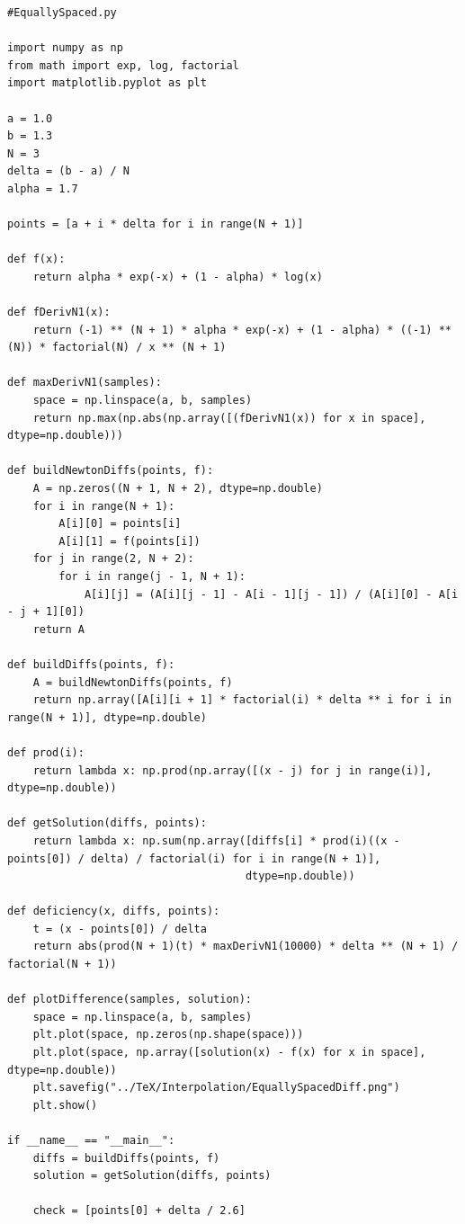 \documentclass[14pt, a4paper]{article}
\begin{document}
\begin{lstlisting}
#EquallySpaced.py

import numpy as np
from math import exp, log, factorial
import matplotlib.pyplot as plt

a = 1.0
b = 1.3
N = 3
delta = (b - a) / N
alpha = 1.7

points = [a + i * delta for i in range(N + 1)]

def f(x):
    return alpha * exp(-x) + (1 - alpha) * log(x)

def fDerivN1(x):
    return (-1) ** (N + 1) * alpha * exp(-x) + (1 - alpha) * ((-1) ** (N)) * factorial(N) / x ** (N + 1)

def maxDerivN1(samples):
    space = np.linspace(a, b, samples)
    return np.max(np.abs(np.array([(fDerivN1(x)) for x in space], dtype=np.double)))

def buildNewtonDiffs(points, f):
    A = np.zeros((N + 1, N + 2), dtype=np.double)
    for i in range(N + 1):
        A[i][0] = points[i]
        A[i][1] = f(points[i])
    for j in range(2, N + 2):
        for i in range(j - 1, N + 1):
            A[i][j] = (A[i][j - 1] - A[i - 1][j - 1]) / (A[i][0] - A[i - j + 1][0])
    return A

def buildDiffs(points, f):
    A = buildNewtonDiffs(points, f)
    return np.array([A[i][i + 1] * factorial(i) * delta ** i for i in range(N + 1)], dtype=np.double)

def prod(i):
    return lambda x: np.prod(np.array([(x - j) for j in range(i)], dtype=np.double))

def getSolution(diffs, points):
    return lambda x: np.sum(np.array([diffs[i] * prod(i)((x - points[0]) / delta) / factorial(i) for i in range(N + 1)],
                                     dtype=np.double))

def deficiency(x, diffs, points):
    t = (x - points[0]) / delta
    return abs(prod(N + 1)(t) * maxDerivN1(10000) * delta ** (N + 1) / factorial(N + 1))

def plotDifference(samples, solution):
    space = np.linspace(a, b, samples)
    plt.plot(space, np.zeros(np.shape(space)))
    plt.plot(space, np.array([solution(x) - f(x) for x in space], dtype=np.double))
    plt.savefig("../TeX/Interpolation/EquallySpacedDiff.png")
    plt.show()

if __name__ == "__main__":
    diffs = buildDiffs(points, f)
    solution = getSolution(diffs, points)
    
    check = [points[0] + delta / 2.6]
    

\end{lstlisting}
\end{document}
